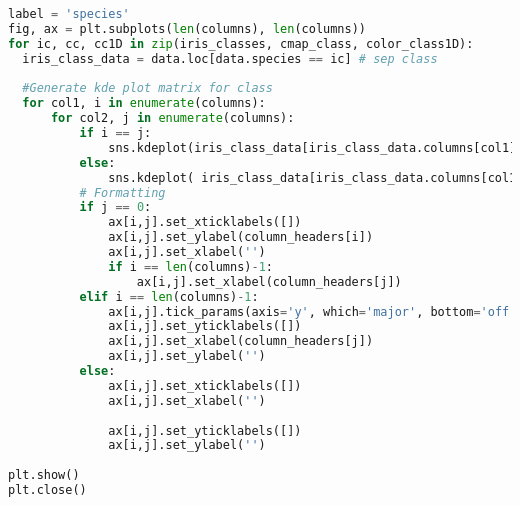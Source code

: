 \begin{lstlisting}[language=python]
label = 'species'
fig, ax = plt.subplots(len(columns), len(columns))
for ic, cc, cc1D in zip(iris_classes, cmap_class, color_class1D): 
  iris_class_data = data.loc[data.species == ic] # sep class
   
  #Generate kde plot matrix for class
  for col1, i in enumerate(columns):
      for col2, j in enumerate(columns):
          if i == j:
              sns.kdeplot(iris_class_data[iris_class_data.columns[col1]], ax=ax[col1][col2], color=cc1D, shade=True, legend=False)
          else:
              sns.kdeplot( iris_class_data[iris_class_data.columns[col1]], iris_class_data[iris_class_data.columns[col2]], ax=ax[col1][col2], cmap=cc)    
          # Formatting
          if j == 0:
              ax[i,j].set_xticklabels([])
              ax[i,j].set_ylabel(column_headers[i])
              ax[i,j].set_xlabel('')
              if i == len(columns)-1:
                  ax[i,j].set_xlabel(column_headers[j])
          elif i == len(columns)-1:
              ax[i,j].tick_params(axis='y', which='major', bottom='off')
              ax[i,j].set_yticklabels([])
              ax[i,j].set_xlabel(column_headers[j])
              ax[i,j].set_ylabel('')                
          else:
              ax[i,j].set_xticklabels([])
              ax[i,j].set_xlabel('')
              
              ax[i,j].set_yticklabels([])
              ax[i,j].set_ylabel('')
  
plt.show()
plt.close()
\end{lstlisting}

\clearpage

